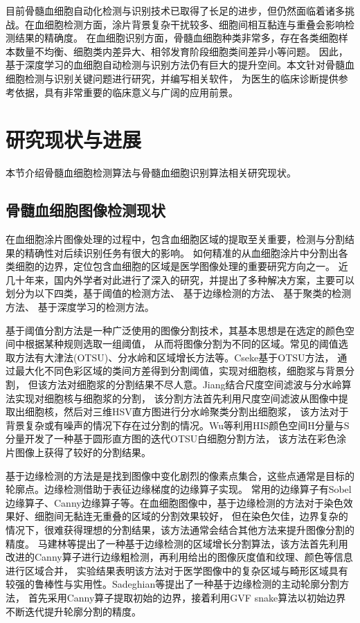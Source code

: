 目前骨髓血细胞自动化检测与识别技术已取得了长足的进步，但仍然面临着诸多挑战。在血细胞检测方面，涂片背景复杂干扰较多、细胞间相互黏连与重叠会影响检测结果的精确度。
在血细胞识别方面，骨髓血细胞种类非常多，存在各类细胞样本数量不均衡、细胞类内差异大、相邻发育阶段细胞类间差异小等问题。
因此，基于深度学习的血细胞自动检测与识别方法仍有巨大的提升空间。本文针对骨髓血细胞检测与识别关键问题进行研究，并编写相关软件，
为医生的临床诊断提供参考依据，具有非常重要的临床意义与广阔的应用前景。



\section{研究现状与进展}
本节介绍骨髓血细胞检测算法与骨髓血细胞识别算法相关研究现状。
\subsection{骨髓血细胞图像检测现状}
在血细胞涂片图像处理的过程中，包含血细胞区域的提取至关重要，检测与分割结果的精确性对后续识别任务有很大的影响。
如何精准的从血细胞涂片中分割出各类细胞的边界，定位包含血细胞的区域是医学图像处理的重要研究方向之一。
近几十年来，国内外学者对此进行了深入的研究，并提出了多种解决方案，主要可以划分为以下四类，基于阈值的检测方法\cite{1992A,2003A,Wu2006}、
基于边缘检测的方法\cite{Ma2008Novel,Sadeghian2009A}、
基于聚类的检测方法\cite{theera2005white, ramoser2006leukocyte}、
基于深度学习的检测方法\cite{xia2019automated,dhieb2019automated,shakarami2021fast,lu2021wbc}。

基于阈值分割方法是一种广泛使用的图像分割技术，其基本思想是在选定的颜色空间中根据某种规则选取一组阈值，
从而将图像分割为不同的区域。常见的阈值选取方法有大津法(OTSU)、分水岭和区域增长方法等。Cseke\cite{1992A}基于OTSU方法，
通过最大化不同色彩区域的类间方差得到分割阈值，实现对细胞核，细胞浆与背景分割，
但该方法对细胞浆的分割结果不尽人意。Jiang\cite{2003A}结合尺度空间滤波与分水岭算法实现对细胞核与细胞浆的分割，
该分割方法首先利用尺度空间滤波从图像中提取出细胞核，然后对三维HSV直方图进行分水岭聚类分割出细胞浆，
该方法对于背景复杂或有噪声的情况下存在过分割的情况。Wu\cite{Wu2006}等利用HIS颜色空间H分量与S分量开发了一种基于圆形直方图的迭代OTSU白细胞分割方法，
该方法在彩色涂片图像上获得了较好的分割结果。

基于边缘检测的方法是是找到图像中变化剧烈的像素点集合，这些点通常是目标的轮廓点。边缘检测借助于表征边缘梯度的边缘算子实现。
常用的边缘算子有Sobel边缘算子、Canny边缘算子等。在血细胞图像中，基于边缘检测的方法对于染色效果好、细胞间无黏连无重叠的区域的分割效果较好，
但在染色欠佳，边界复杂的情况下，很难获得理想的分割结果，该方法通常会结合其他方法来提升图像分割的精度。
马建林\cite{Ma2008Novel}等提出了一种基于边缘检测的区域增长分割算法，该方法首先利用改进的Canny算子进行边缘粗检测，再利用给出的图像灰度值和纹理、颜色等信息进行区域合并，
实验结果表明该方法对于医学图像中的复杂区域与畸形区域具有较强的鲁棒性与实用性。Sadeghian\cite{Sadeghian2009A}等提出了一种基于边缘检测的主动轮廓分割方法，
首先采用Canny算子提取初始的边界，接着利用GVF snake算法以初始边界不断迭代提升轮廓分割的精度。

